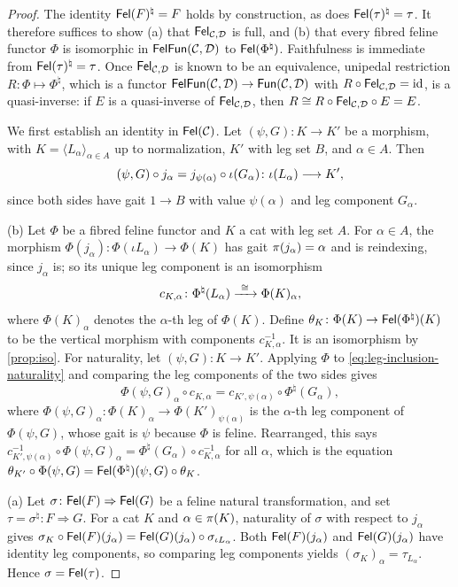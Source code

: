 \begin{proof}
The identity $\mathsf{Fel}(F)^\natural=F$ holds by construction, as does
$\mathsf{Fel}(\tau)^\natural=\tau$. It therefore suffices to show (a) that
$\mathsf{Fel}_{\mathcal{C},\mathcal{D}}$ is full, and (b) that every fibred feline functor $\Phi$ is
isomorphic in $\mathsf{FelFun}(\mathcal{C},\mathcal{D})$ to $\mathsf{Fel}(\Phi^\natural)$. Faithfulness is
immediate from $\mathsf{Fel}(\tau)^\natural=\tau$. Once $\mathsf{Fel}_{\mathcal{C},\mathcal{D}}$ is known to be
an equivalence, unipedal restriction $R\colon\Phi\mapsto\Phi^\natural$, which is a
functor $\mathsf{FelFun}(\mathcal{C},\mathcal{D})\to\mathsf{Fun}(\mathcal{C},\mathcal{D})$ with $R\circ\mathsf{Fel}_{\mathcal{C},\mathcal{D}}=\mathrm{id}$, is a
quasi-inverse: if $E$ is a quasi-inverse of $\mathsf{Fel}_{\mathcal{C},\mathcal{D}}$, then
$R\cong R\circ\mathsf{Fel}_{\mathcal{C},\mathcal{D}}\circ E=E$.

We first establish an identity in $\mathsf{Fel}(\mathcal{C})$. Let $(\psi,G)\colon K\to K'$ be a
morphism, with $K=\langle L_\alpha\rangle_{\alpha\in A}$ up to normalization,
$K'$ with leg set $B$, and $\alpha\in A$. Then
\begin{equation}\label{eq:leg-inclusion-naturality}
(\psi,G)\circ j_\alpha=j_{\psi(\alpha)}\circ\iota(G_\alpha)\colon\iota(L_\alpha)\longrightarrow K',
\end{equation}
since both sides have gait $1\to B$ with value $\psi(\alpha)$ and leg component
$G_\alpha$.

(b) Let $\Phi$ be a fibred feline functor and $K$ a cat with leg set $A$. For
$\alpha\in A$, the morphism $\Phi(j_\alpha)\colon\Phi(\iota L_\alpha)\to\Phi(K)$
has gait $\pi(j_\alpha)=\alpha$ and is reindexing, since $j_\alpha$ is; so
its unique leg component is an isomorphism
\[
c_{K,\alpha}\colon\Phi^\natural(L_\alpha)\xrightarrow{\ \iso\ }\Phi(K)_\alpha,
\]
where $\Phi(K)_\alpha$ denotes the $\alpha$-th leg of $\Phi(K)$. Define
$\theta_K\colon\Phi(K)\to\mathsf{Fel}(\Phi^\natural)(K)$ to be the vertical morphism
with components $c_{K,\alpha}^{-1}$. It is an isomorphism by
\cref{prop:iso}. For naturality, let $(\psi,G)\colon K\to K'$. Applying $\Phi$
to \eqref{eq:leg-inclusion-naturality} and comparing the leg components of
the two sides gives
\[
\Phi(\psi,G)_\alpha\circ c_{K,\alpha}=c_{K',\psi(\alpha)}\circ\Phi^\natural(G_\alpha),
\]
where $\Phi(\psi,G)_\alpha\colon\Phi(K)_\alpha\to\Phi(K')_{\psi(\alpha)}$ is the
$\alpha$-th leg component of $\Phi(\psi,G)$, whose gait is $\psi$ because $\Phi$
is feline. Rearranged, this says
$c_{K',\psi(\alpha)}^{-1}\circ\Phi(\psi,G)_\alpha=\Phi^\natural(G_\alpha)\circ c_{K,\alpha}^{-1}$
for all $\alpha$, which is the equation
$\theta_{K'}\circ\Phi(\psi,G)=\mathsf{Fel}(\Phi^\natural)(\psi,G)\circ\theta_K$.

(a) Let $\sigma\colon\mathsf{Fel}(F)\Rightarrow\mathsf{Fel}(G)$ be a feline natural
transformation, and set $\tau=\sigma^\natural\colon F\Rightarrow G$. For a cat
$K$ and $\alpha\in\pi(K)$, naturality of $\sigma$ with respect to $j_\alpha$
gives $\sigma_K\circ\mathsf{Fel}(F)(j_\alpha)=\mathsf{Fel}(G)(j_\alpha)\circ\sigma_{\iota L_\alpha}$.
Both $\mathsf{Fel}(F)(j_\alpha)$ and $\mathsf{Fel}(G)(j_\alpha)$ have identity leg components,
so comparing leg components yields $(\sigma_K)_\alpha=\tau_{L_\alpha}$. Hence
$\sigma=\mathsf{Fel}(\tau)$.
\end{proof}

